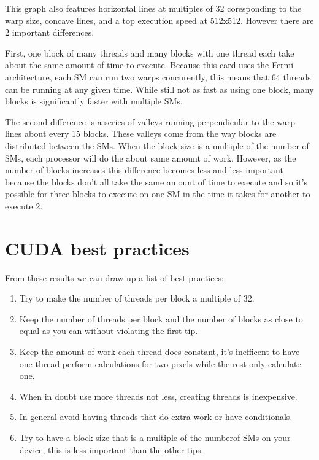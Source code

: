 \documentclass[letterpaper,10pt,openany,oneside]{sphinxmanual}
\begin{document}
This graph also features horizontal lines at multiples of
32 coresponding to the warp size, concave lines, and a top
execution speed at 512x512. However there are 2 important
differences.

First, one block of many threads and many blocks with one
thread each take about the same amount of time to execute.
Because this card uses the Fermi architecture, each SM can run
two warps concurently, this means that 64 threads can be running
at any given time. While still not as fast as using one block,
many blocks is significantly faster with multiple SMs.

The second difference is a series of valleys running
perpendicular to the warp lines about every 15 blocks.
These valleys come from the way blocks are distributed
between the SMs. When the block size is a multiple of the
number of SMs, each processor will do the about same
amount of work. However, as the number of blocks increases
this difference becomes less and less important because
the blocks don't all take the same amount of time to execute
and so it's possible for three blocks to execute on one SM
in the time it takes for another to execute 2.


\section{CUDA best practices}
\label{2-Findings/Findings:cuda-best-practices}
From these results we can draw up a list of best practices:
\begin{enumerate}
\item {} 
Try to make the number of threads per block a multiple of 32.

\item {} 
Keep the number of threads per block and the number of blocks as close to equal as you can without violating the first tip.

\item {} 
Keep the amount of work each thread does constant, it's inefficent to have one thread perform calculations for two pixels while the rest only calculate one.

\item {} 
When in doubt use more threads not less, creating threads is inexpensive.

\item {} 
In general avoid having threads that do extra work or have conditionals.

\item {} 
Try to have a block size that is a multiple of the numberof SMs on your device, this is less important than the other tips.

\end{enumerate}



\renewcommand{\indexname}{Index}
\printindex
\end{document}
